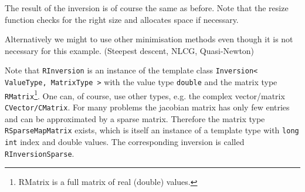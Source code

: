 The result of the inversion is of course the same as before.
Note that the resize function checks for the right size and allocates space if necessary.

Alternatively we might to use other minimisation methods even though it is not necessary for this example.
\sperre (Steepest descent, NLCG, Quasi-Newton)

Note that \lstinline|RInversion| is an instance of the template class \lstinline|Inversion< ValueType, MatrixType >| with the value type \lstinline|double| and the matrix type \lstinline|RMatrix|\footnote{RMatrix is a full matrix of real (double) values.}.
One can, of course, use other types, e.g. the complex vector/matrix \lstinline|CVector/CMatrix|. 
For many problems the jacobian matrix has only few entries and can be approximated by a sparse matrix.
Therefore the matrix type \lstinline|RSparseMapMatrix| exists, which is itself an instance of a template type with \lstinline|long int| index and double values. 
The corresponding inversion is called \lstinline|RInversionSparse|.
